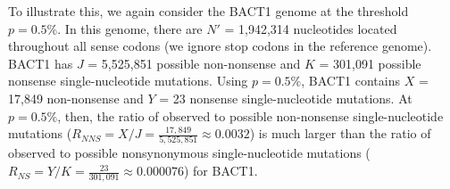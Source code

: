To illustrate this, we again consider
the BACT1 genome at the threshold $p = 0.5\%$.
%
In this genome, there are $N'$ = 1,942,314 nucleotides
located throughout all sense codons (we ignore stop codons in the reference genome).
%
BACT1 has $J$ = 5,525,851 possible non-nonsense and
$K$ = 301,091 possible nonsense single-nucleotide mutations.
%
Using $p = 0.5\%$, BACT1 contains
$X$ = 17,849 non-nonsense and
$Y$ = 23 nonsense single-nucleotide mutations.
%
At $p = 0.5\%$, then, the ratio of observed to possible non-nonsense single-nucleotide mutations
($R_{NNS} = X / J = \frac{17,849}{5,525,851}
\approx 0.0032$)
is much larger than the ratio of observed to possible nonsynonymous single-nucleotide mutations
($R_{NS} = Y / K = \frac{23}{301,091}
\approx 0.000076$)
for BACT1.
\endinput